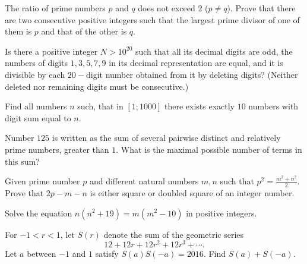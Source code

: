 \documentclass[problems.tex]{subfile}
\begin{document}
	\begin{problem}
		The ratio of prime numbers $p$ and $q$ does not exceed $2$ ($p \neq q$). Prove
		that there are two consecutive positive integers such that the largest
		prime divisor of one of them is $p$ and that of the other is $q$.
	\end{problem}

	\begin{problem}
		Is there a positive integer $N > 10^{20}$ such that all its decimal digits
		are odd, the numbers of digits $1, 3, 5, 7, 9$ in its decimal representation
		are equal, and it is divisible by each $20-$digit number obtained from it by
		deleting digits? (Neither deleted nor remaining digits must be consecutive.)
	\end{problem}

	\begin{problem}
		Find all numbers $n$ such, that in $[1;1000]$ there exists exactly $10$ numbers with digit sum equal to $n$. %
	\end{problem}

	\begin{problem}
		Number $125$ is written as the sum of several pairwise distinct and relatively prime numbers, greater than $1$. What is the maximal possible number of terms in this sum? %
	\end{problem}

	\begin{problem}
		Given prime number $p$ and different natural numbers $m, n$ such that $p^2=\frac{m^2+n^2}{2}$. Prove that $2p-m-n$ is either square or doubled square of an integer number. %
	\end{problem}

	\begin{problem}
		Solve the equation $n(n^2+19)=m(m^2-10)$ in positive integers. %
	\end{problem}

	\begin{problem}
		For $-1 < r < 1$, let $S(r)$ denote the sum of the geometric series \[12 + 12r + 12r^2 + 12r^3 + \cdots.\]Let $a$ between $-1$ and $1$ satisfy $S(a)S(-a)=2016$. Find $S(a) + S(-a)$. %
	\end{problem}
\end{document}
